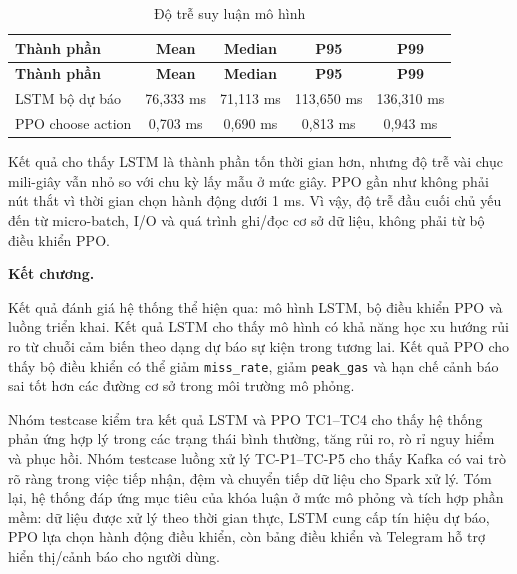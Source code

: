 \begingroup
\small
\renewcommand{\arraystretch}{1.25}
\setlength{\tabcolsep}{4pt}
\setlength{\LTleft}{\fill}
\setlength{\LTright}{\fill}

\begin{longtable}{lcccc}
\caption{Độ trễ suy luận mô hình}
\label{tab:latency_model} \\
\toprule
\textbf{Thành phần} & \textbf{Mean} & \textbf{Median} & \textbf{P95} & \textbf{P99} \\
\midrule
\endfirsthead
\toprule
\textbf{Thành phần} & \textbf{Mean} & \textbf{Median} & \textbf{P95} & \textbf{P99} \\
\midrule
\endhead
\endfoot
\bottomrule
\endlastfoot
LSTM bộ dự báo & 76{,}333 ms & 71{,}113 ms & 113{,}650 ms & 136{,}310 ms \\
PPO choose action & 0{,}703 ms & 0{,}690 ms & 0{,}813 ms & 0{,}943 ms \\
\end{longtable}
\endgroup

Kết quả cho thấy LSTM là thành phần tốn thời gian hơn, nhưng độ trễ vài chục mili-giây vẫn nhỏ so với chu kỳ lấy mẫu ở mức giây. PPO gần như không phải nút thắt vì thời gian chọn hành động dưới 1 ms. Vì vậy, độ trễ đầu cuối chủ yếu đến từ micro-batch, I/O và quá trình ghi/đọc cơ sở dữ liệu, không phải từ bộ điều khiển PPO.

\vspace{0.5em}
\noindent\textbf{Kết chương.}

Kết quả đánh giá hệ thống thể hiện qua: mô hình LSTM, bộ điều khiển PPO và luồng triển khai. Kết quả LSTM cho thấy mô hình có khả năng học xu hướng rủi ro từ chuỗi cảm biến theo dạng dự báo sự kiện trong tương lai. Kết quả PPO cho thấy bộ điều khiển có thể giảm \texttt{miss\_rate}, giảm \texttt{peak\_gas} và hạn chế cảnh báo sai tốt hơn các đường cơ sở trong môi trường mô phỏng.

Nhóm testcase kiểm tra kết quả LSTM và PPO TC1--TC4 cho thấy hệ thống phản ứng hợp lý trong các trạng thái bình thường, tăng rủi ro, rò rỉ nguy hiểm và phục hồi. Nhóm testcase luồng xử lý TC-P1--TC-P5 cho thấy Kafka có vai trò rõ ràng trong việc tiếp nhận, đệm và chuyển tiếp dữ liệu cho Spark xử lý. Tóm lại, hệ thống đáp ứng mục tiêu của khóa luận ở mức mô phỏng và tích hợp phần mềm: dữ liệu được xử lý theo thời gian thực, LSTM cung cấp tín hiệu dự báo, PPO lựa chọn hành động điều khiển, còn bảng điều khiển và Telegram hỗ trợ hiển thị/cảnh báo cho người dùng.
